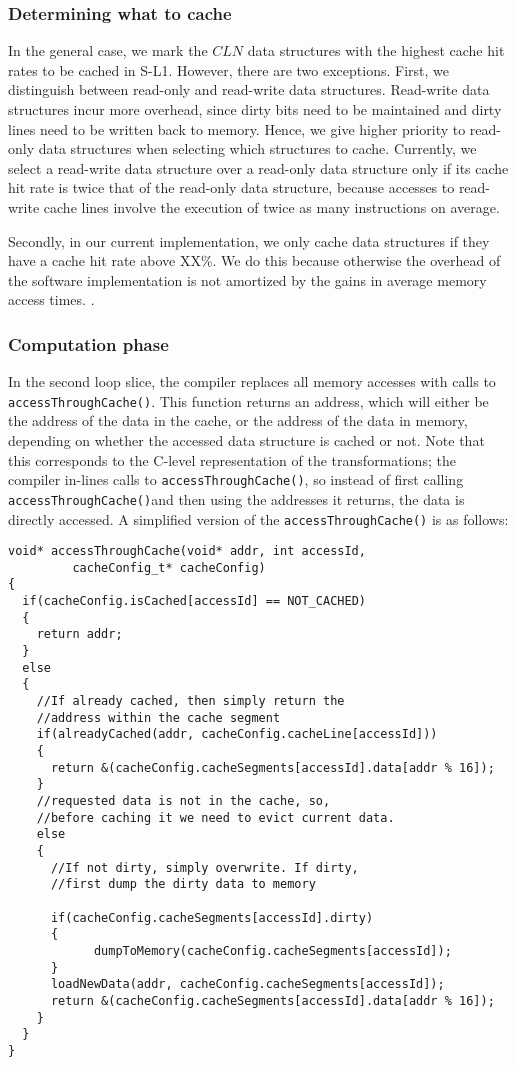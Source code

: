 \subsubsection{\bf Determining what to cache} 
In the general case, we mark the $CLN$ data structures with the highest cache hit rates to be cached in S-L1.
However, there are two exceptions. 
First,  we distinguish between read-only and read-write data structures.
Read-write data structures incur more overhead, since dirty bits need to be maintained and dirty lines need to be written back to memory.
Hence, we give higher priority to read-only data structures when selecting which structures to cache.
Currently, we select a read-write data structure over a read-only data structure only
if its cache hit rate is twice that of the read-only data structure, because accesses to read-write cache lines involve the execution of twice as many instructions on average.

Secondly, in our current implementation, we only cache data structures if they have a cache hit rate above XX\%. 
We do this because otherwise the overhead of the software implementation is not amortized by the gains in average memory access times.
.

\subsubsection{Computation phase}
In the second loop slice, the compiler replaces all memory accesses with calls to \texttt{accessThroughCache()}. 
This function returns an address, which will either be the address of the data in the cache, or the address of the data in memory, depending on whether the accessed data structure is cached or not. 
Note that this corresponds to the C-level representation of the transformations; 
the compiler in-lines calls to \texttt{accessThroughCache()}, so instead of first calling \texttt{accessThroughCache()}and then using the addresses it returns, the data is directly accessed.
A simplified version of the \texttt{accessThroughCache()} is as follows:

{\footnotesize
\begin{verbatim}
void* accessThroughCache(void* addr, int accessId, 
         cacheConfig_t* cacheConfig)
{
  if(cacheConfig.isCached[accessId] == NOT_CACHED)
  {
    return addr;
  }
  else
  {
    //If already cached, then simply return the 
    //address within the cache segment
    if(alreadyCached(addr, cacheConfig.cacheLine[accessId]))
    {
      return &(cacheConfig.cacheSegments[accessId].data[addr % 16]);
    }
    //requested data is not in the cache, so, 
    //before caching it we need to evict current data.
    else 
    {
      //If not dirty, simply overwrite. If dirty, 
      //first dump the dirty data to memory

      if(cacheConfig.cacheSegments[accessId].dirty)
      {
	        dumpToMemory(cacheConfig.cacheSegments[accessId]);
      }
      loadNewData(addr, cacheConfig.cacheSegments[accessId]);
      return &(cacheConfig.cacheSegments[accessId].data[addr % 16]);
    }
  }
}
\end{verbatim}
}

